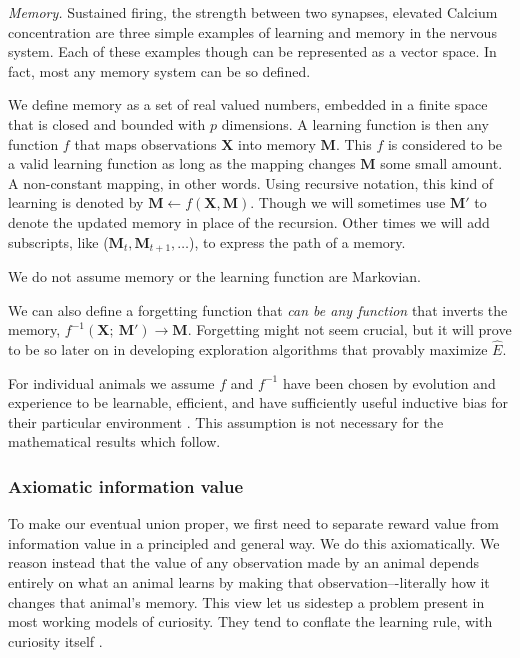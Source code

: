 \emph{Memory.} Sustained firing, the strength between two synapses, elevated Calcium concentration are three simple examples of learning and memory in the nervous system. Each of these examples though can be represented as a vector space. In fact, most any memory system can be so defined. 

We define memory as a set of real valued numbers, embedded in a finite space that is closed and bounded with $p$ dimensions. A learning function is then any function $f$ that maps observations $\mathbf{X}$ into memory $\mathbf{M}$. This $f$ is considered to be a valid learning function as long as the mapping changes $\mathbf{M}$ some small amount. A non-constant mapping, in other words. Using recursive notation, this kind of learning is denoted by $\mathbf{M} \leftarrow f(\mathbf{X},\mathbf{M}) $. Though we will sometimes use $\mathbf{M'}$ to denote the updated memory in place of the recursion. Other times we will add subscripts, like ($\mathbf{M}_t,\mathbf{M}_{t+1},\ldots$), to express the path of a memory.

We do not assume memory or the learning function are Markovian.

We can also define a forgetting function that \textit{can be any function} that inverts the memory, $f^{-1}(\mathbf{X};\ \mathbf{M}') \rightarrow \mathbf{M}$. Forgetting might not seem crucial, but it will prove to be so later on in developing exploration algorithms that provably maximize $\hat E$. 

For individual animals we assume $f$ and $f^{-1}$ have been chosen by evolution and experience to be learnable, efficient, and have sufficiently useful inductive bias for their particular environment \cite{Valiant1984,Thrun1992a}. This assumption is not necessary for the mathematical results which follow.


\subsubsection*{Axiomatic information value} 
To make our eventual union proper, we first need to separate reward value from information value in a principled and general way. We do this axiomatically.
We reason instead that the value of any observation made by an animal depends entirely on what an animal learns by making that observation–-literally how it changes that animal's memory. This view let us sidestep a problem present in most working models of curiosity. They tend to conflate the learning rule, with curiosity itself \cite{TODO}.

